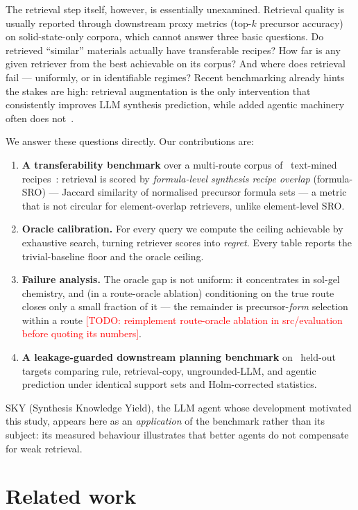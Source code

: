 \documentclass[10pt]{article}
\newcommand{\todo}[1]{\textcolor{red}{[TODO: #1]}}
\begin{document}
The retrieval step itself, however, is essentially unexamined. Retrieval
quality is usually reported through downstream proxy metrics (top-$k$
precursor accuracy) on solid-state-only corpora, which cannot answer three
basic questions. Do retrieved ``similar'' materials actually have
transferable recipes? How far is any given retriever from the best
achievable on its corpus? And where does retrieval fail --- uniformly, or
in identifiable regimes? Recent benchmarking already hints the stakes are
high: retrieval augmentation is the only intervention that consistently
improves LLM synthesis prediction, while added agentic machinery often
does not~\cite{iclr2026benchmark}.

We answer these questions directly. Our contributions are:
\begin{enumerate}
\item \textbf{A transferability benchmark} over a multi-route corpus of
  \corpusSize\ text-mined recipes~\cite{kononova2019text}: retrieval is
  scored by \emph{formula-level synthesis recipe overlap} (formula-SRO) ---
  Jaccard similarity of normalised precursor formula sets --- a metric that
  is not circular for element-overlap retrievers, unlike element-level SRO.
\item \textbf{Oracle calibration.} For every query we compute the ceiling
  achievable by exhaustive search, turning retriever scores into
  \emph{regret}. Every table reports the trivial-baseline floor and the
  oracle ceiling.
\item \textbf{Failure analysis.} The oracle gap is not uniform: it
  concentrates in sol-gel chemistry, and (in a route-oracle ablation)
  conditioning on the true route closes only a small fraction of it ---
  the remainder is precursor-\emph{form} selection within a route
  \todo{reimplement route-oracle ablation in src/evaluation before
  quoting its numbers}.
\item \textbf{A leakage-guarded downstream planning benchmark} on
  \nPlanningCases\ held-out targets comparing rule, retrieval-copy,
  ungrounded-LLM, and agentic prediction under identical support sets and
  Holm-corrected statistics.
\end{enumerate}

SKY (Synthesis Knowledge Yield), the LLM agent whose development motivated
this study, appears here as an \emph{application} of the benchmark rather
than its subject: its measured behaviour illustrates that better agents do
not compensate for weak retrieval.

\section{Related work}
\end{document}
